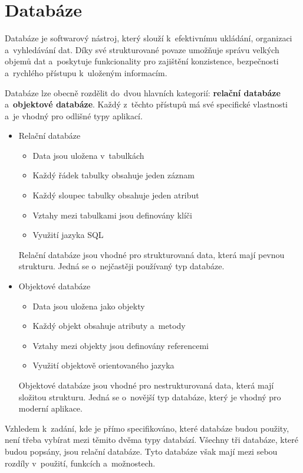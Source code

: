 \chapter{Databáze}
Databáze je softwarový nástroj, který slouží k~efektivnímu ukládání, organizaci a~vyhledávání dat. 
Díky své strukturované povaze umožňuje správu velkých objemů dat a~poskytuje funkcionality pro 
zajištění konzistence, bezpečnosti a~rychlého přístupu k~uloženým informacím.

Databáze lze obecně rozdělit do~dvou hlavních kategorií: \textbf{relační databáze} a~\textbf{objektové databáze}. 
Každý z~těchto přístupů má své specifické vlastnosti a~je vhodný pro odlišné typy aplikací.

\begin{itemize}
    \item Relační databáze
    \begin{itemize}[itemsep=-1pt]
        \item Data jsou uložena v~tabulkách
        \item Každý řádek tabulky obsahuje jeden záznam
        \item Každý sloupec tabulky obsahuje jeden atribut
        \item Vztahy mezi tabulkami jsou definovány klíči
        \item Využití jazyka SQL
    \end{itemize}
    Relační databáze jsou vhodné pro strukturovaná data, která mají pevnou strukturu.
    Jedná se o~nejčastěji používaný typ databáze.

    \item Objektové databáze
    \begin{itemize}[itemsep=-1pt]
        \item Data jsou uložena jako objekty
        \item Každý objekt obsahuje atributy a~metody
        \item Vztahy mezi objekty jsou definovány referencemi
        \item Využití objektově orientovaného jazyka
    \end{itemize}
    Objektové databáze jsou vhodné pro nestrukturovaná data, která mají složitou strukturu.
    Jedná se o~novější typ databáze, který je vhodný pro moderní aplikace.
\end{itemize}

\newpage
Vzhledem k~zadání, kde je přímo specifikováno, které databáze budou použity,
není třeba vybírat mezi těmito dvěma typy databází. Všechny tři databáze, které budou popsány,
jsou relační databáze. Tyto databáze však mají mezi sebou rozdíly v~použití, funkcích a~možnostech.

